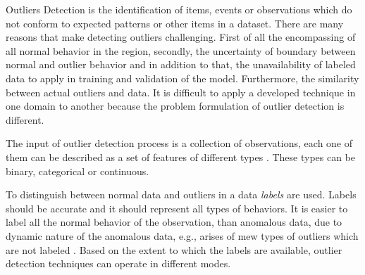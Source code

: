 Outliers Detection is the identification of items, events or observations which do not conform to expected patterns or other items in a dataset.
There are many reasons that make detecting outliers challenging. First of all the encompassing of all normal behavior in the region, secondly, the uncertainty of boundary between normal and outlier behavior and in addition to that, the unavailability of labeled data to apply in training and validation of the model. Furthermore, the similarity between actual outliers and data. %
It is difficult to apply a developed technique in one domain to another because the problem formulation of outlier detection is different. 
%

The input of outlier detection process is a collection of observations, each one of them can be described as a set of features of different types \citep{Kurukshetra}. These types can be binary, categorical or continuous. 

To distinguish between normal data and outliers in a data \textit{labels} are used. Labels should be accurate and it should represent all types of behaviors. It is easier to label all the normal behavior of the observation, than anomalous data, due to dynamic nature of the anomalous data, e.g., arises of mew types of outliers which are not labeled \citep{Survey}. Based on the extent to which the labels are available, outlier detection techniques can operate in different modes.

